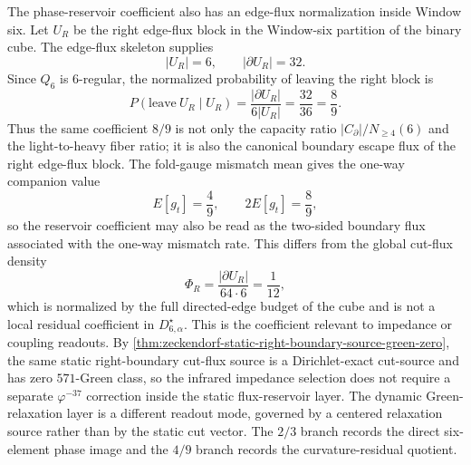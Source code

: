 \begin{principle}
\label{prin:zeckendorf-right-block-flux-reservoir-coefficient}
The phase-reservoir coefficient also has an edge-flux normalization
inside Window six. Let \(U_R\) be the right edge-flux block in the
Window-six partition of the binary cube. The edge-flux skeleton supplies
$$
  |U_R|=6,
  \qquad
  |\partial U_R|=32.
$$
Since \(Q_6\) is \(6\)-regular, the normalized probability of leaving
the right block is
$$
  P(\mathrm{leave}\ U_R\mid U_R)
  =
  \frac{|\partial U_R|}{6|U_R|}
  =
  \frac{32}{36}
  =
  \frac89.
$$
Thus the same coefficient \(8/9\) is not only the capacity ratio
\(|C_\partial|/N_{\geq4}(6)\) and the light-to-heavy fiber ratio; it is
also the canonical boundary escape flux of the right edge-flux block.
The fold-gauge mismatch mean gives the one-way companion value
$$
  E[g_t]=\frac49,
  \qquad
  2E[g_t]=\frac89,
$$
so the reservoir coefficient may also be read as the two-sided boundary
flux associated with the one-way mismatch rate. This differs from the
global cut-flux density
$$
  \Phi_R=\frac{|\partial U_R|}{64\cdot6}=\frac1{12},
$$
which is normalized by the full directed-edge budget of the cube and is
not a local residual coefficient in \(D_{6,\alpha}^{\star}\).
This is the coefficient relevant to impedance or coupling readouts. By
\autoref{thm:zeckendorf-static-right-boundary-source-green-zero}, the
same static right-boundary cut-flux source is a Dirichlet-exact
cut-source and has zero $571$-Green class, so the infrared impedance
selection does not require a separate $\varphi^{-37}$ correction inside
the static flux-reservoir layer. The dynamic Green-relaxation layer is a
different readout mode, governed by a centered relaxation source rather
than by the static cut vector. The $2/3$ branch records the direct
six-element phase image and the $4/9$ branch records the
curvature-residual quotient.
\end{principle}

